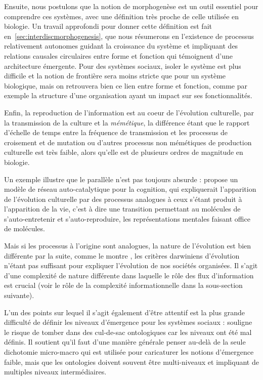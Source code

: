 Ensuite, nous postulons que la notion de morphogenèse est un outil essentiel pour comprendre ces systèmes, avec une définition très proche de celle utilisée en biologie. Un travail approfondi pour donner cette définition est fait en~\ref{sec:interdiscmorphogenesis}, que nous résumerons en l'existence de processus relativement autonomes guidant la croissance du système et impliquant des relations causales circulaires entre forme et fonction qui témoignent d'une architecture émergente. Pour des systèmes sociaux, isoler le système est plus difficile et la notion de frontière sera moins stricte que pour un système biologique, mais on retrouvera bien ce lien entre forme et fonction, comme par exemple la structure d'une organisation ayant un impact sur ses fonctionnalités.


Enfin, la reproduction de l'information est au coeur de l'évolution culturelle, par la transmission de la culture et la \emph{mémétique}, la différence étant que le rapport d'échelle de temps entre la fréquence de transmission et les processus de croisement et de mutation ou d'autres processus non mémétiques de production culturelle est très faible, alors qu'elle est de plusieurs ordres de magnitude en biologie.


Un exemple illustre que le parallèle n'est pas toujours absurde :\cite{2017arXiv170305917G} propose un modèle de réseau auto-catalytique pour la cognition, qui expliquerait l'apparition de l'évolution culturelle par des processus analogues à ceux s'étant produit à l'apparition de la vie, c'est à dire une transition permettant au molécules de s'auto-entretenir et s'auto-reproduire, les représentations mentales faisant office de molécules.


Mais si les processus à l'origine sont analogues, la nature de l'évolution est bien différente par la suite, comme le montre \cite{vanderLeeuw2009}, les critères darwiniens d'évolution n'étant pas suffisant pour expliquer l'évolution de nos sociétés organisées. Il s'agit d'une complexité de nature différente dans laquelle le rôle des flux d'information est crucial (voir le rôle de la complexité informationnelle dans la sous-section suivante). 


L'un des points sur lequel il s'agit également d'être attentif est la plus grande difficulté de définir les niveaux d'émergence pour les systèmes sociaux : \cite{roth2009reconstruction} souligne le risque de tomber dans des cul-de-sac ontologiques car les niveaux ont été mal définis. Il soutient qu'il faut d'une manière générale penser au-delà de la seule dichotomie micro-macro qui est utilisée pour caricaturer les notions d'émergence faible, mais que les ontologies doivent souvent être multi-niveaux et impliquant de multiples niveaux intermédiaires.


